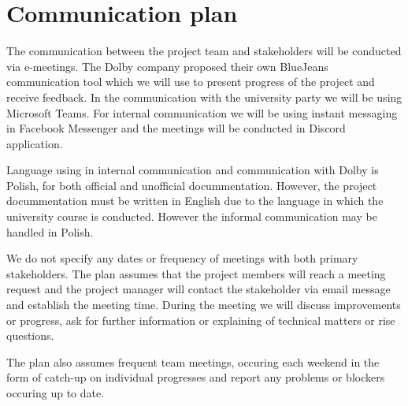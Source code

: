 \documentclass[12pt]{article}
\begin{document}
\section{Communication plan}
	
	The communication between the project team and stakeholders will be conducted via e-meetings. The Dolby company proposed their own BlueJeans communication tool which we will use to present progress of the project and receive feedback. In the communication with the university party we will be using Microsoft Teams. For internal communication we will be using instant messaging in Facebook Messenger and the meetings will be conducted in Discord application.
	
	Language using in internal communication and communication with Dolby is Polish, for both official and unofficial docummentation. However, the project docummentation must be written in English due to the language in which the university course is conducted. However the informal communication may be handled in Polish.
	
	We do not specify any dates or frequency of meetings with both primary stakeholders. The plan assumes that the project members will reach a meeting request and the project manager will contact the stakeholder via email message and establish the meeting time. During the meeting we will discuss improvements or progress, ask for further information or explaining of technical matters or rise questions.
	
	The plan also assumes frequent team meetings, occuring each weekend in the form of catch-up on individual progresses and report any problems or blockers occuring up to date.
	
\end{document}
